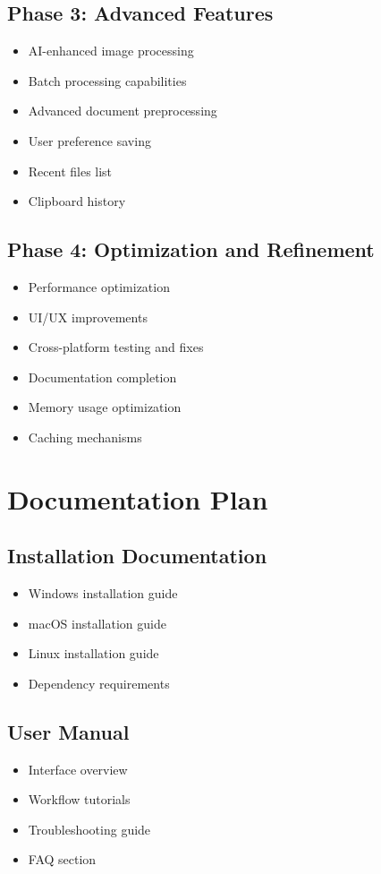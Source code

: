 \documentclass[12pt]{article}
\begin{document}
\subsection{Phase 3: Advanced Features}
\begin{itemize}
    \item AI-enhanced image processing
    \item Batch processing capabilities
    \item Advanced document preprocessing
    \item User preference saving
    \item Recent files list
    \item Clipboard history
\end{itemize}

\subsection{Phase 4: Optimization and Refinement}
\begin{itemize}
    \item Performance optimization
    \item UI/UX improvements
    \item Cross-platform testing and fixes
    \item Documentation completion
    \item Memory usage optimization
    \item Caching mechanisms
\end{itemize}

\section{Documentation Plan}

\subsection{Installation Documentation}
\begin{itemize}
    \item Windows installation guide
    \item macOS installation guide
    \item Linux installation guide
    \item Dependency requirements
\end{itemize}

\subsection{User Manual}
\begin{itemize}
    \item Interface overview
    \item Workflow tutorials
    \item Troubleshooting guide
    \item FAQ section
\end{itemize}
\end{document}
